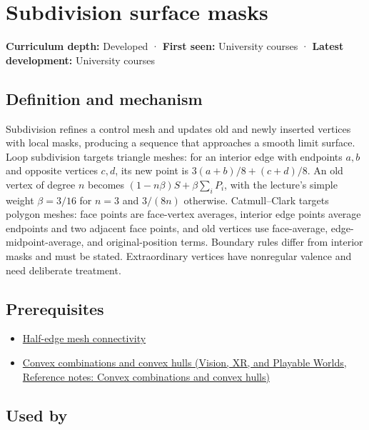 \hypertarget{appendix-0234ab7f86b1}{}\label{referencestart:appendix-0234ab7f86b1}
\section{Subdivision surface masks}\label{appendix-0234ab7f86b1-subdivision-surface-masks}

\textbf{Curriculum depth:} Developed · \textbf{First seen:} University courses · \textbf{Latest development:} University courses

\subsection{Definition and mechanism}\label{appendix-0234ab7f86b1-definition-and-mechanism}

Subdivision refines a control mesh and updates old and newly inserted vertices with local masks, producing a sequence that approaches a smooth limit surface. Loop subdivision targets triangle meshes: for an interior edge with endpoints \(a,b\) and opposite vertices \(c,d\), its new point is \(3(a+b)/8+(c+d)/8\). An old vertex of degree \(n\) becomes \((1-n\beta)S+\beta\sum_iP_i\), with the lecture's simple weight \(\beta=3/16\) for \(n=3\) and \(3/(8n)\) otherwise. Catmull--Clark targets polygon meshes: face points are face-vertex averages, interior edge points average endpoints and two adjacent face points, and old vertices use face-average, edge-midpoint-average, and original-position terms. Boundary rules differ from interior masks and must be stated. Extraordinary vertices have nonregular valence and need deliberate treatment.

\subsection{Prerequisites}\label{appendix-0234ab7f86b1-prerequisites}

\begin{itemize}
\tightlist
\item
  \hyperref[appendix-1aea26b2307f]{Half-edge mesh connectivity}
\item
  \href{../07-Vision-XR-and-Playable-Worlds/main.pdf\#nameddest=appendix-0026ec42c9d5}{Convex combinations and convex hulls (Vision, XR, and Playable Worlds, Reference notes: Convex combinations and convex hulls)}
\end{itemize}

\subsection{Used by}\label{appendix-0234ab7f86b1-used-by}

